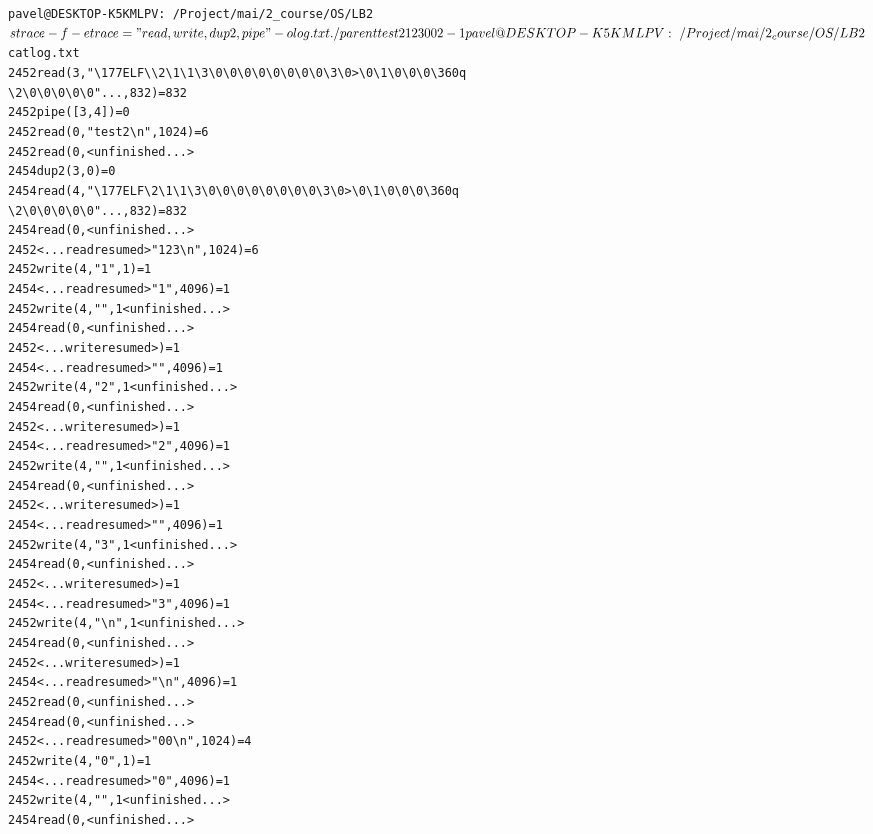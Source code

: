 \documentclass[pdf, unicode, 12pt, a4paper,oneside,fleqn]{article}
\begin{document}
\begin{alltt}
pavel@DESKTOP-K5KMLPV:~/Project/mai/2_course/OS/LB2$ strace -f -e 
trace="read,write,dup2,pipe" -o log.txt ./parent
test2
1 2 3
0 0
2 -1
pavel@DESKTOP-K5KMLPV:~/Project/mai/2_course/OS/LB2$ cat log.txt
2452  read(3, "\textbackslash177ELF\textbackslash\textbackslash2\textbackslash1\textbackslash1\textbackslash3\textbackslash0\textbackslash0\textbackslash0\textbackslash0\textbackslash0\textbackslash0\textbackslash0\textbackslash0\textbackslash3\textbackslash0>\textbackslash0\textbackslash1\textbackslash0\textbackslash0\textbackslash0\textbackslash360q
\textbackslash2\textbackslash0\textbackslash0\textbackslash0\textbackslash0\textbackslash0"..., 832) = 832
2452  pipe([3, 4])                      = 0
2452  read(0, "test2\textbackslash n", 1024)          = 6
2452  read(0,  <unfinished ...>
2454  dup2(3, 0)                        = 0
2454  read(4, "\textbackslash177ELF\textbackslash2\textbackslash1\textbackslash1\textbackslash3\textbackslash0\textbackslash0\textbackslash0\textbackslash0\textbackslash0\textbackslash0\textbackslash0\textbackslash0\textbackslash3\textbackslash0>\textbackslash0\textbackslash1\textbackslash0\textbackslash0\textbackslash0\textbackslash360q
\textbackslash2\textbackslash0\textbackslash0\textbackslash0\textbackslash0\textbackslash0"..., 832) = 832
2454  read(0,  <unfinished ...>
2452  <... read resumed>"1 2 3\textbackslash{n}", 1024) = 6
2452  write(4, "1", 1)                  = 1
2454  <... read resumed>"1", 4096)      = 1
2452  write(4, " ", 1 <unfinished ...>
2454  read(0,  <unfinished ...>
2452  <... write resumed>)              = 1
2454  <... read resumed>" ", 4096)      = 1
2452  write(4, "2", 1 <unfinished ...>
2454  read(0,  <unfinished ...>
2452  <... write resumed>)              = 1
2454  <... read resumed>"2", 4096)      = 1
2452  write(4, " ", 1 <unfinished ...>
2454  read(0,  <unfinished ...>
2452  <... write resumed>)              = 1
2454  <... read resumed>" ", 4096)      = 1
2452  write(4, "3", 1 <unfinished ...>
2454  read(0,  <unfinished ...>
2452  <... write resumed>)              = 1
2454  <... read resumed>"3", 4096)      = 1
2452  write(4, "\textbackslash{n}", 1 <unfinished ...>
2454  read(0,  <unfinished ...>
2452  <... write resumed>)              = 1
2454  <... read resumed>"\textbackslash{n}", 4096)     = 1
2452  read(0,  <unfinished ...>
2454  read(0,  <unfinished ...>
2452  <... read resumed>"0 0\textbackslash{n}", 1024)  = 4
2452  write(4, "0", 1)                  = 1
2454  <... read resumed>"0", 4096)      = 1
2452  write(4, " ", 1 <unfinished ...>
2454  read(0,  <unfinished ...>

\end{alltt}
\end{document}
